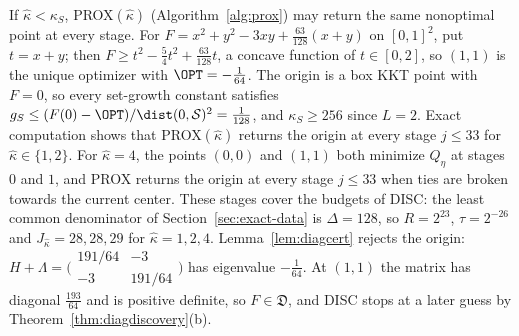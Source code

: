 \begin{remark}\label{rem:falseguess}
If $\hat\kappa<\kappa_S$, PROX$(\hat\kappa)$ (Algorithm~\ref{alg:prox}) may
return the same nonoptimal
point at every stage. For $F=x^2+y^2-3xy+\frac{63}{128}(x+y)$ on $[0,1]^2$, put
$t=x+y$; then $F\ge t^2-\frac54t^2+\frac{63}{128}t$, a concave function of
$t\in[0,2]$, so $(1,1)$ is the unique optimizer with $\OPT=-\frac1{64}$. The
origin is a box KKT point with $F=0$, so every set-growth constant
satisfies $g_S\le(F(0)-\OPT)/\dist(0,\mathcal S)^2=\frac1{128}$, and
$\kappa_S\ge256$ since $L=2$. Exact computation shows that
PROX$(\hat\kappa)$ returns the origin at every stage $j\le33$ for
$\hat\kappa\in\{1,2\}$. For
$\hat\kappa=4$, the points $(0,0)$ and $(1,1)$ both minimize $Q_\eta$ at
stages $0$ and $1$, and PROX returns the origin at every stage $j\le33$ when
ties are broken towards the current center. These stages cover the budgets
of DISC: the least common denominator of Section~\ref{sec:exact-data} is
$\Delta=128$, so $R=2^{23}$, $\tau=2^{-26}$ and $J_{\hat\kappa}=28,28,29$ for
$\hat\kappa=1,2,4$. Lemma~\ref{lem:diagcert} rejects the origin:
$H+\Lambda=\bigl(\begin{smallmatrix}191/64&-3\\-3&191/64\end{smallmatrix}\bigr)$
has eigenvalue $-\frac1{64}$. At $(1,1)$ the matrix has diagonal
$\frac{193}{64}$ and is positive definite, so $F\in\mathfrak D$, and DISC
stops at a later guess by Theorem~\ref{thm:diagdiscovery}(b).
\end{remark}
